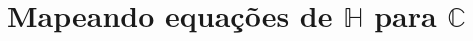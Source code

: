 \chapter{Mapeando equações de $ \mathbb{H} $ para $ \mathbb{C} $}
\label{ch:AppendixA}

\lipsum[1-2]